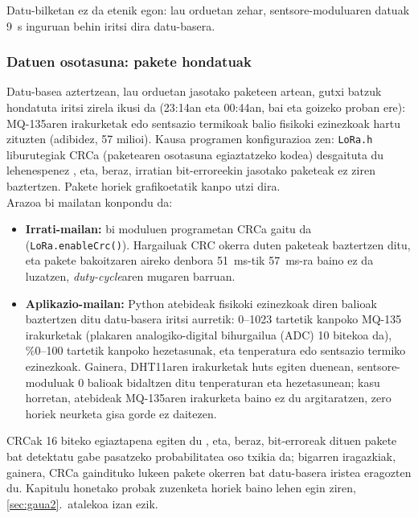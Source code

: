 \documentclass[10pt]{article}
\newcommand{\acpar}[1]{(\acs{#1})\acused{#1}}
\begin{document}
Datu-bilketan ez da etenik egon: lau orduetan zehar, sentsore-moduluaren datuak 9~s inguruan behin iritsi dira datu-basera.\\

\subsubsection{Datuen osotasuna: pakete hondatuak}
\label{sec:crc}

Datu-basea aztertzean, lau orduetan jasotako paketeen artean, gutxi batzuk hondatuta iritsi zirela ikusi da (23:14an eta 00:44an, bai eta goizeko proban ere): MQ-135aren irakurketak edo sentsazio termikoak balio fisikoki ezinezkoak hartu zituzten (adibidez, 57 milioi). Kausa programen konfigurazioa zen: \texttt{LoRa.h} liburutegiak CRCa (paketearen osotasuna egiaztatzeko kodea) desgaituta du lehenespenez \cite{arduinolora}, eta, beraz, irratian bit-erroreekin jasotako paketeak ez ziren baztertzen. Pakete horiek grafikoetatik kanpo utzi dira.\\

Arazoa bi mailatan konpondu da:
\begin{itemize}
    \item \textbf{Irrati-mailan:} bi moduluen programetan CRCa gaitu da (\texttt{LoRa.enableCrc()}). Hargailuak CRC okerra duten paketeak baztertzen ditu, eta pakete bakoitzaren aireko denbora 51~ms-tik 57~ms-ra baino ez da luzatzen, \textit{duty-cycle}aren mugaren barruan.
    \item \textbf{Aplikazio-mailan:} Python atebideak fisikoki ezinezkoak diren balioak baztertzen ditu datu-basera iritsi aurretik: 0--1023 tartetik kanpoko MQ-135 irakurketak (plakaren analogiko-digital bihurgailua \acpar{ADC} 10 bitekoa da), \%0--100 tartetik kanpoko hezetasunak, eta tenperatura edo sentsazio termiko ezinezkoak. Gainera, DHT11aren irakurketak huts egiten duenean, sentsore-moduluak 0 balioak bidaltzen ditu tenperaturan eta hezetasunean; kasu horretan, atebideak MQ-135aren irakurketa baino ez du argitaratzen, zero horiek neurketa gisa gorde ez daitezen.
\end{itemize}

CRCak 16 biteko egiaztapena egiten du \cite{sx1276datasheet}, eta, beraz, bit-erroreak dituen pakete bat detektatu gabe pasatzeko probabilitatea oso txikia da; bigarren iragazkiak, gainera, CRCa gaindituko lukeen pakete okerren bat datu-basera iristea eragozten du. Kapitulu honetako probak zuzenketa horiek baino lehen egin ziren, \ref{sec:gaua2}.~atalekoa izan ezik.\\
\end{document}
